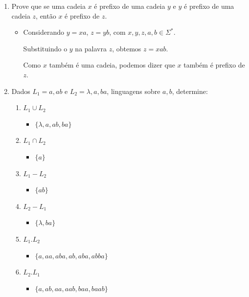 \documentclass[12pt]{article}
\begin{document}
\begin{enumerate}
\begin{itemize}[label=R:]
    \end{itemize}
    \item Prove que se uma cadeia $x$ é prefixo de uma cadeia $y$ e $y$ é prefixo 
    de uma cadeia $z$, então $x$ é prefixo de $z$.
    \begin{itemize}[label=R:]
        \item Considerando $y=xa$, $z=yb$, com $x,y,z,a,b \in \Sigma^*$.
        
        Substituindo o $y$ na palavra $z$, obtemos $z=xab$.

        Como $x$ também é uma cadeia, podemos dizer que $x$ também é prefixo de 
        $z$.
    \end{itemize}
    \item Dados $L_1={a, ab}$ e $L_2={\lambda, a, ba}$, linguagens sobre 
    ${a, b}$, determine:
    \begin{enumerate}[label=\alph*.]
        \item $L_1 \cup L_2$
        \begin{itemize}[label=R:]
            \item $\{\lambda,a,ab,ba\}$
        \end{itemize}
        \item $L_1 \cap L_2$
        \begin{itemize}[label=R:]
            \item $\{a\}$
        \end{itemize}
        \item $L_1 - L_2$
        \begin{itemize}[label=R:]
            \item $\{ab\}$
        \end{itemize}
        \item $L_2 - L_1$
        \begin{itemize}[label=R:]
            \item $\{\lambda,ba\}$
        \end{itemize}
        \item $L_1.L_2$
        \begin{itemize}[label=R:]
            \item $\{a,aa,aba,ab,aba,abba\}$
        \end{itemize}
        \item $L_2.L_1$
        \begin{itemize}[label=R:]
            \item $\{a,ab,aa,aab,baa,baab\}$
        \end{itemize}

\end{enumerate}
\end{enumerate}
\end{document}
